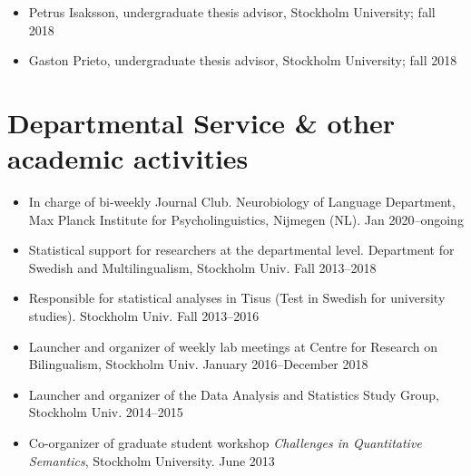 \documentclass[margin, 11pt]{res} %
\begin{document}
\begin{resume}
\begin{itemize}
\item Petrus Isaksson, undergraduate thesis advisor, Stockholm University; fall 2018

\item Gaston Prieto, undergraduate thesis advisor, Stockholm University; fall 2018

\end{itemize}



\section{\sc Departmental Service \& other academic activities}

\begin{itemize}

\item In charge of bi-weekly Journal Club. Neurobiology of Language Department, Max Planck Institute for Psycholinguistics, Nijmegen (NL). Jan 2020--ongoing

\item Statistical support for researchers at the departmental level. Department for Swedish and Multilingualism, Stockholm Univ.
Fall 2013--2018

\item Responsible for statistical analyses in Tisus (Test in Swedish for university studies). Stockholm Univ. Fall 2013--2016

\item Launcher and organizer of weekly lab meetings at Centre for Research on Bilingualism, Stockholm Univ. January 2016--December 2018

\item Launcher and organizer of the Data Analysis and Statistics Study Group, Stockholm Univ. 2014--2015

\item Co-organizer of graduate student workshop \emph{Challenges in Quantitative Semantics}, Stockholm University. June 2013

\end{itemize}




\end{resume}
\end{document}
